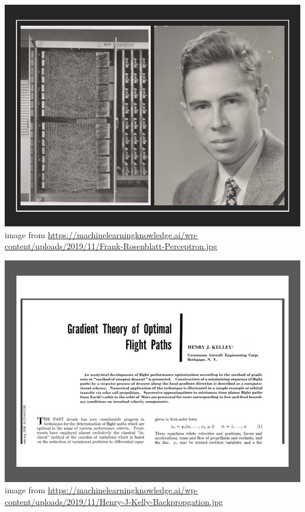 \documentclass[12pt,a4paper]{article}
\begin{document}
\includegraphics[scale=0.5]{franklin-rosenblatt.jpg}\newline
image from \url{https://machinelearningknowledge.ai/wp-content/uploads/2019/11/Frank-Rosenblatt-Perceptron.jpg}

\includegraphics[scale=0.5]{henrykelley-backprop.jpg}\newline
image from \url{https://machinelearningknowledge.ai/wp-content/uploads/2019/11/Henry-J-Kelly-Backpropgation.jpg}
\end{document}
